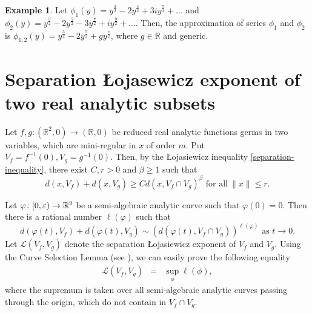 \documentclass[reqno, 12pt ,a4letter]{amsart}
\theoremstyle{definition}
\newtheorem {example}[theorem]{Example}
\begin{document}
\begin{example}
	Let $\phi_1(y) = y^{\frac{3}{2}} - 2y^{\frac{5}{2}} + 3iy^{\frac{7}{2}} + \dots$ and $\phi_2(y) = y^{\frac{3}{2}} - 2y^{\frac{5}{2}} - 3y^{\frac{7}{2}} + iy^{\frac{9}{2}} + \dots$. Then, the approximation of series $\phi_1$ and $\phi_2$ is $\phi_{1,2}(y) = y^{\frac{3}{2}} - 2y^{\frac{5}{2}} + gy^{\frac{7}{2}}$, where $g \in \mathbb{R}$ and generic.
\end{example}
\section{Separation \L ojasewicz exponent of two real analytic subsets}\label{Section3}
Let $f, g \colon (\mathbb{R}^2,0) \to (\mathbb{R},0)$ be reduced real analytic functions germs in two variables, which are mini-regular in $x$ of order $m$. Put $V_f = f^{-1}(0), V_g = g^{-1}(0)$. Then, by the \L ojasiewicz inequality \eqref{separation-inequality}, there exist $C, r > 0$ and $\beta \ge 1$ such that
\begin{equation}\label{separation}
	d(x, V_f) + d(x, V_g) \geq Cd(x, V_f \cap V_g)^\beta \text{ for all}\ \|x\| \leq r.
\end{equation} 


Let $\varphi\colon [0,\varepsilon)\to \Bbb R^2$ be a semi-algebraic analytic curve such that $\varphi(0)=0$. Then there is a rational number $\ell(\varphi)$ such that
$$d(\varphi(t), V_f)+d(\varphi(t), V_g)\sim \left(d(\varphi(t), V_f \cap V_g)\right)^{\ell(\varphi)}\text{ as } t\to 0.$$
Let $\mathscr{L}(V_f, V_g)$ denote the separation \L ojasiewicz exponent of $V_f$ and $V_g$. Using the Curve Selection Lemma (see \cite{Milnor1968}), we can easily prove the following equality
\begin{eqnarray}\label{Eqn10}
	\mathscr{L}(V_f, V_g) &=& \sup_\phi \ell(\phi),
\end{eqnarray}
where the supremum is taken over all semi-algebraic analytic curves passing through the origin, which do not contain in $V_f \cap V_g$.
\end{document}

